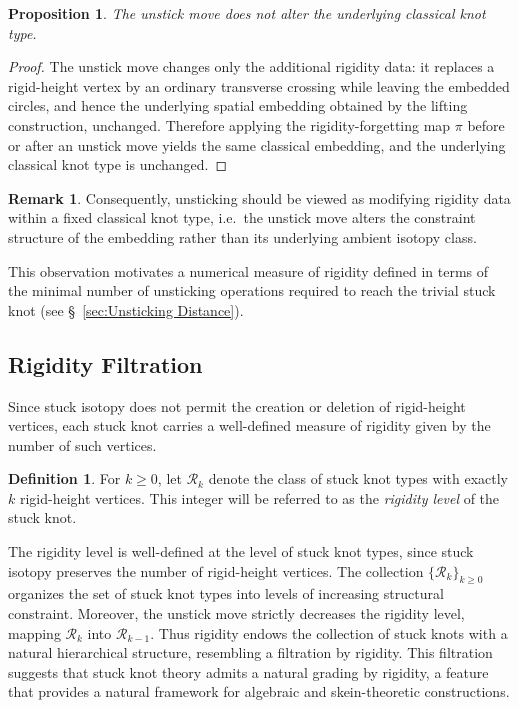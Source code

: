 \documentclass[11pt,a4paper]{article}
\theoremstyle{plain}
\newtheorem{proposition}[theorem]{Proposition}
\theoremstyle{definition}
\newtheorem{definition}[theorem]{Definition}
\newtheorem{remark}[theorem]{Remark}
\begin{document}
\begin{proposition}
The unstick move does not alter the underlying classical knot type.
\end{proposition}

\begin{proof}
The unstick move changes only the additional rigidity data: it replaces a rigid-height vertex by an ordinary transverse crossing while leaving the embedded circles, and hence the underlying spatial embedding obtained by the lifting construction, unchanged. Therefore applying the rigidity-forgetting map $\pi$ before or after an unstick move yields the same classical embedding, and the underlying classical knot type is unchanged.
\end{proof}

\begin{remark}
Consequently, unsticking should be viewed as modifying rigidity data within a fixed classical knot type, i.e.\ the unstick move alters the constraint structure of the embedding rather than its underlying ambient isotopy class.
\end{remark}

This observation motivates a numerical measure of rigidity defined in terms of the minimal number of unsticking operations required to reach the trivial stuck knot (see \S~\ref{sec:Unsticking Distance}).


\subsection{Rigidity Filtration}\label{subsec:filtration}

Since stuck isotopy does not permit the creation or deletion of rigid-height vertices, each stuck knot carries a well-defined measure of rigidity given by the number of such vertices.

\begin{definition}
For $k \ge 0$, let $\mathcal{R}_k$ denote the class of stuck knot types with exactly $k$ rigid-height vertices. This integer will be referred to as the {\it rigidity level} of the stuck knot.
\end{definition}

The rigidity level is well-defined at the level of stuck knot types, since stuck isotopy preserves the number of rigid-height vertices. The collection $\{\mathcal{R}_k\}_{k \ge 0}$ organizes the set of stuck knot types into levels of increasing structural constraint. Moreover, the unstick move strictly decreases the rigidity level, mapping $\mathcal{R}_k$ into $\mathcal{R}_{k-1}$. Thus rigidity endows the collection of stuck knots with a natural hierarchical structure, resembling a filtration by rigidity. This filtration suggests that stuck knot theory admits a natural grading by rigidity, a feature that provides a natural framework for algebraic and skein-theoretic constructions.
\end{document}
